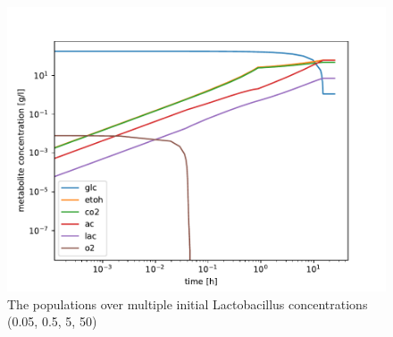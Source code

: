 		\begin{figure}[h]
			\includegraphics[width=\linewidth]{figures/results/cocultures/1_metabolites.pdf}
			\caption{The populations over multiple initial Lactobacillus concentrations (0.05, 0.5, 5, 50)}
			\label{fig:cocult_pops}
		\end{figure}

